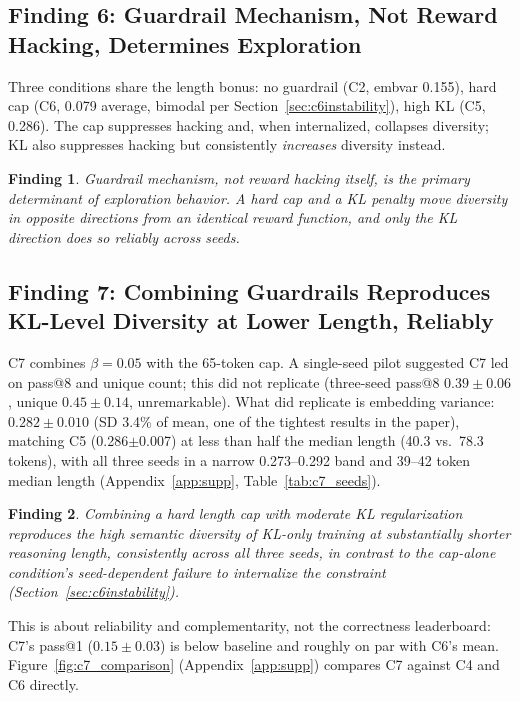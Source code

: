 \documentclass{article}
\newtheorem{finding}{Finding}
\begin{document}
\subsection{Finding 6: Guardrail Mechanism, Not Reward Hacking, Determines Exploration}

Three conditions share the length bonus: no guardrail (C2, embvar 0.155), hard cap (C6, 0.079 average, bimodal per Section~\ref{sec:c6instability}), high KL (C5, 0.286). The cap suppresses hacking and, when internalized, collapses diversity; KL also suppresses hacking but consistently \emph{increases} diversity instead.

\begin{finding}
\label{find:guardrailmech}
Guardrail mechanism, not reward hacking itself, is the primary determinant of exploration behavior. A hard cap and a KL penalty move diversity in opposite directions from an identical reward function, and only the KL direction does so reliably across seeds.
\end{finding}

\subsection{Finding 7: Combining Guardrails Reproduces KL-Level Diversity at Lower Length, Reliably}
\label{sec:c7}

C7 combines $\beta=0.05$ with the 65-token cap. A single-seed pilot suggested C7 led on pass@8 and unique count; this did not replicate (three-seed pass@8 $0.39\pm0.06$, unique $0.45\pm0.14$, unremarkable). What did replicate is embedding variance: $0.282\pm0.010$ (SD 3.4\% of mean, one of the tightest results in the paper), matching C5 (0.286$\pm$0.007) at less than half the median length (40.3 vs.\ 78.3 tokens), with all three seeds in a narrow 0.273--0.292 band and 39--42 token median length (Appendix~\ref{app:supp}, Table~\ref{tab:c7_seeds}).

\begin{finding}
\label{find:c7combined}
Combining a hard length cap with moderate KL regularization reproduces the high semantic diversity of KL-only training at substantially shorter reasoning length, consistently across all three seeds, in contrast to the cap-alone condition's seed-dependent failure to internalize the constraint (Section~\ref{sec:c6instability}).
\end{finding}

This is about reliability and complementarity, not the correctness leaderboard: C7's pass@1 ($0.15\pm0.03$) is below baseline and roughly on par with C6's mean. Figure~\ref{fig:c7_comparison} (Appendix~\ref{app:supp}) compares C7 against C4 and C6 directly.
\end{document}
